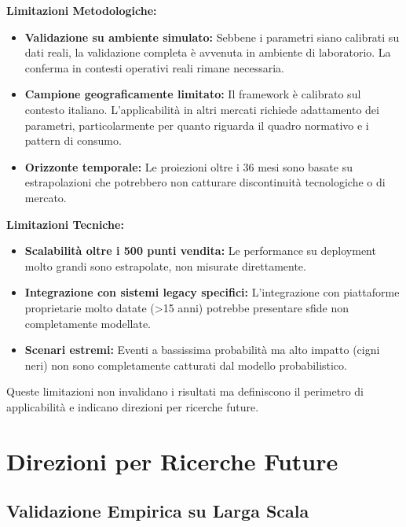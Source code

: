 \textbf{Limitazioni Metodologiche:}
\begin{itemize}
\item \textbf{Validazione su ambiente simulato:} Sebbene i parametri siano calibrati su dati reali, la validazione completa è avvenuta in ambiente di laboratorio. La conferma in contesti operativi reali rimane necessaria.

\item \textbf{Campione geograficamente limitato:} Il framework è calibrato sul contesto italiano. L'applicabilità in altri mercati richiede adattamento dei parametri, particolarmente per quanto riguarda il quadro normativo e i pattern di consumo.

\item \textbf{Orizzonte temporale:} Le proiezioni oltre i 36 mesi sono basate su estrapolazioni che potrebbero non catturare discontinuità tecnologiche o di mercato.
\end{itemize}

\textbf{Limitazioni Tecniche:}
\begin{itemize}
\item \textbf{Scalabilità oltre i 500 punti vendita:} Le performance su deployment molto grandi sono estrapolate, non misurate direttamente.

\item \textbf{Integrazione con sistemi legacy specifici:} L'integrazione con piattaforme proprietarie molto datate (>15 anni) potrebbe presentare sfide non completamente modellate.

\item \textbf{Scenari estremi:} Eventi a bassissima probabilità ma alto impatto (cigni neri) non sono completamente catturati dal modello probabilistico.
\end{itemize}

Queste limitazioni non invalidano i risultati ma definiscono il perimetro di applicabilità e indicano direzioni per ricerche future.

\section{\texorpdfstring{Direzioni per Ricerche Future}{5.7 - Direzioni per Ricerche Future}}
\label{sec:5.7}

\subsection{\texorpdfstring{Validazione Empirica su Larga Scala}{5.7.1 - Validazione Empirica su Larga Scala}}
\label{subsec:5.7.1}

